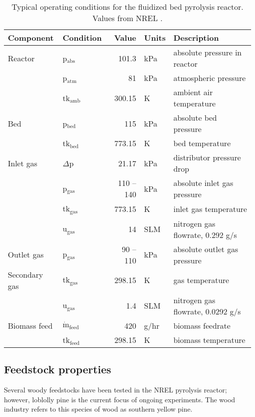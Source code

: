 \begin{table}[H]
    \centering
    \caption{Typical operating conditions for the fluidized bed pyrolysis reactor. Values from NREL \cite{French-2019}.}
    \label{tab:operating}
    \begin{tabular}{llrll}
        \toprule
        Component & Condition & Value & Units & Description \\
        \midrule
        Reactor
            & p$_\textrm{abs}$ & 101.3 & kPa & absolute pressure in reactor \\
            & p$_\textrm{atm}$ & 81 & kPa & atmospheric pressure \\
            & tk$_\textrm{amb}$ & 300.15 & K & ambient air temperature \\
        Bed
            & p$_\textrm{bed}$ & 115 & kPa & absolute bed pressure \\
            & tk$_\textrm{bed}$ & 773.15 & K & bed temperature \\
        Inlet gas
            & $\Delta$p & 21.17 & kPa & distributor pressure drop \\
            & p$_\textrm{gas}$ & 110 -- 140 & kPa & absolute inlet gas pressure \\
            & tk$_\textrm{gas}$ & 773.15 & K & inlet gas temperature \\
            & u$_\textrm{gas}$ & 14 & SLM & nitrogen gas flowrate, 0.292 g/s \\
        Outlet gas
            & p$_\textrm{gas}$ & 90 -- 110 & kPa & absolute outlet gas pressure \\
        Secondary gas
            & tk$_\textrm{gas}$ & 298.15 & K & gas temperature \\
            & u$_\textrm{gas}$ & 1.4 & SLM & nitrogen gas flowrate, 0.0292 g/s \\
        Biomass feed
            & $\dot{\textrm{m}}_\textrm{feed}$ & 420 & g/hr & biomass feedrate \\
            & tk$_\textrm{feed}$ & 298.15 & K & biomass temperature \\
        \bottomrule
    \end{tabular}
\end{table}

\subsection{Feedstock properties}

Several woody feedstocks have been tested in the NREL pyrolysis reactor; however, loblolly pine is the current focus of ongoing experiments. The wood industry refers to this species of wood as southern yellow pine.

